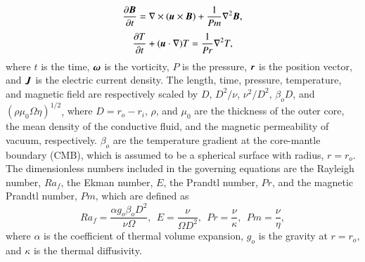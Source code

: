 %
\begin{equation}
\frac{\partial \mbox{\boldmath$B$}}{\partial t} =
 \nabla \times (\mbox{\boldmath$u$} \times \mbox{\boldmath$B$} )
 + \frac{1}{Pm} \nabla^2 \mbox{\boldmath$B$} ,
\label{eq:induction}
\end{equation}
%
\begin{equation}
\frac{\partial T}{\partial t} 
 + ( \mbox{\boldmath$u$} \cdot \nabla ) T =
 \frac{1}{Pr} \nabla^2 T ,
\label{eq:heat}
\end{equation}
%
where $t$ is the time, $\mbox{\boldmath$\omega$}$ is the vorticity, $P$ is the pressure, $\mbox{\boldmath$r$}$ is the position vector, and $\mbox{\boldmath$J$}$ is the electric current density.
The length, time, pressure, temperature, and magnetic field are respectively scaled by $D$, $D^2/\nu$, $\nu^2 /D^2$, $\beta_o D$, and $(\rho \mu_0 \Omega \eta )^{1/2}$, %
{\color{green}
where $D = r_o - r_i$, $\rho$, and $\mu_0$ are the thickness of the outer core, the mean density of the conductive fluid, and  the magnetic permeability of vacuum, respectively. $\beta_o$ are  the temperature gradient at the core-mantle boundary (CMB), which is
}
{\color{red} assumed to be a spherical surface with radius,} $r = r_o$.
The dimensionless numbers included in the governing equations are the Rayleigh number, $Ra_f$, the Ekman number, $E$, the Prandtl number, $Pr$, and the magnetic Prandtl number, $Pm$, which are defined as
%
\begin{equation}
Ra_f = \frac{\alpha g_o \beta_o D^2}{\nu \Omega},~~
E = \frac{\nu}{\Omega D^2},~~
Pr = \frac{\nu}{\kappa},~~
Pm = \frac{\nu}{\eta},
\label{eq:dimensionless_numbers}
\end{equation}
%
where $\alpha$ is the coefficient of thermal volume expansion, $g_o$ is the gravity at $r = r_o$, and $\kappa$ is the thermal diffusivity.

